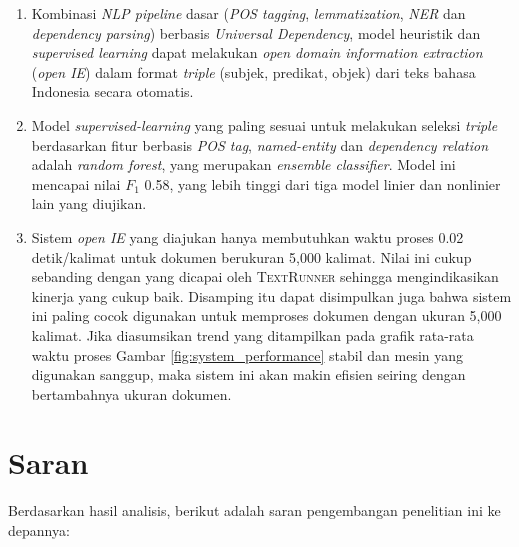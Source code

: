 \begin{enumerate}
	\item Kombinasi \textit{NLP pipeline} dasar (\textit{POS tagging}, \textit{lemmatization}, \textit{NER} dan \textit{dependency parsing}) berbasis \textit{Universal Dependency}, model heuristik dan \textit{supervised learning} dapat melakukan \textit{open domain information extraction} (\textit{open IE}) dalam format \textit{triple} (subjek, predikat, objek) dari teks bahasa Indonesia secara otomatis.
	
	\item Model \textit{supervised-learning} yang paling sesuai untuk melakukan seleksi \textit{triple} berdasarkan fitur berbasis \textit{POS tag}, \textit{named-entity} dan \textit{dependency relation} adalah \textit{random forest}, yang merupakan \textit{ensemble classifier}. Model ini mencapai nilai $F_1$ 0.58, yang lebih tinggi dari tiga model linier dan nonlinier lain yang diujikan.
	
	\item Sistem \textit{open IE} yang diajukan hanya membutuhkan waktu proses 0.02 detik/kalimat untuk dokumen berukuran 5,000 kalimat. Nilai ini cukup sebanding dengan yang dicapai oleh \textsc{TextRunner} \citep{banko2007open} sehingga mengindikasikan kinerja yang cukup baik. Disamping itu dapat disimpulkan juga bahwa sistem ini paling cocok digunakan untuk memproses dokumen dengan ukuran 5,000 kalimat. Jika diasumsikan trend yang ditampilkan pada grafik rata-rata waktu proses Gambar \ref{fig:system_performance} stabil dan mesin yang digunakan sanggup, maka sistem ini akan makin efisien seiring dengan bertambahnya ukuran dokumen.
\end{enumerate}


\section{Saran}

Berdasarkan hasil analisis, berikut adalah saran pengembangan penelitian ini ke depannya:

